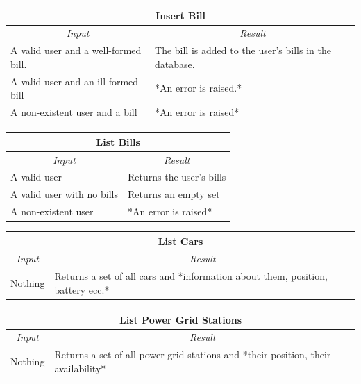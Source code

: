 \documentclass[english]{article}
\begin{document}
\begin{center}

	\begin{tabular}{ | p{6cm} | p{6cm} | }
		\hline
		\multicolumn{2}{|c|}{\textbf{Insert Bill}} \\
		\hline
		\multicolumn{1}{|c|}{\textit{Input}} & \multicolumn{1}{c|}{\textit{Result}} \\
		\hline
		A valid user and a well-formed bill. & The bill is added to the user's bills in the database. \\
		\hline
		A valid user and an ill-formed bill & *An error is raised.* \\
		\hline
		A non-existent user and a bill & *An error is raised* \\
		\hline
	\end{tabular}
\end{center}

\begin{center}

	\begin{tabular}{ | p{6cm} | p{6cm} | }
		\hline
		\multicolumn{2}{|c|}{\textbf{List Bills}} \\
		\hline
		\multicolumn{1}{|c|}{\textit{Input}} & \multicolumn{1}{c|}{\textit{Result}} \\
		\hline
		A valid user & Returns the user's bills \\
		\hline
		A valid user with no bills & Returns an empty set \\
		\hline
		A non-existent user & *An error is raised* \\
		\hline
	\end{tabular}
\end{center}

\begin{center}

	\begin{tabular}{ | p{6cm} | p{6cm} | }
		\hline
		\multicolumn{2}{|c|}{\textbf{List Cars}} \\
		\hline
		\multicolumn{1}{|c|}{\textit{Input}} & \multicolumn{1}{c|}{\textit{Result}} \\
		\hline
		Nothing & Returns a set of all cars and *information about them, position, battery ecc.* \\
		\hline
	\end{tabular}
\end{center}

\begin{center}

	\begin{tabular}{ | p{6cm} | p{6cm} | }
		\hline 
		\multicolumn{2}{|c|}{\textbf{List Power Grid Stations}} \\
		\hline
		\multicolumn{1}{|c|}{\textit{Input}} & \multicolumn{1}{c|}{\textit{Result}} \\
		\hline
		Nothing & Returns a set of all power grid stations and *their position, their availability* \\
		\hline
	\end{tabular}
\end{center}
\end{document}

